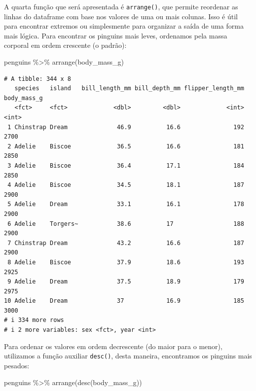 \documentclass[
  12pt,
  letterpaper,
  DIV=11,
  numbers=noendperiod]{scrreprt}
\newenvironment{Shaded}{\begin{snugshade}}{\end{snugshade}}
\newcommand{\FunctionTok}[1]{\textcolor[rgb]{0.28,0.35,0.67}{#1}}
\newcommand{\NormalTok}[1]{\textcolor[rgb]{0.00,0.23,0.31}{#1}}
\newcommand{\SpecialCharTok}[1]{\textcolor[rgb]{0.37,0.37,0.37}{#1}}
\theoremstyle{definition}
\theoremstyle{exemplo}
\begin{document}
A quarta função que será apresentada é \texttt{arrange()}, que permite
reordenar as linhas do dataframe com base nos valores de uma ou mais
colunas. Isso é útil para encontrar extremos ou simplesmente para
organizar a saída de uma forma mais lógica. Para encontrar os pinguins
mais leves, ordenamos pela massa corporal em ordem crescente (o padrão):

\begin{Shaded}
\begin{Highlighting}[]
\NormalTok{penguins }\SpecialCharTok{\%\textgreater{}\%} 
  \FunctionTok{arrange}\NormalTok{(body\_mass\_g)}
\end{Highlighting}
\end{Shaded}

\begin{verbatim}
# A tibble: 344 x 8
   species   island   bill_length_mm bill_depth_mm flipper_length_mm body_mass_g
   <fct>     <fct>             <dbl>         <dbl>             <int>       <int>
 1 Chinstrap Dream              46.9          16.6               192        2700
 2 Adelie    Biscoe             36.5          16.6               181        2850
 3 Adelie    Biscoe             36.4          17.1               184        2850
 4 Adelie    Biscoe             34.5          18.1               187        2900
 5 Adelie    Dream              33.1          16.1               178        2900
 6 Adelie    Torgers~           38.6          17                 188        2900
 7 Chinstrap Dream              43.2          16.6               187        2900
 8 Adelie    Biscoe             37.9          18.6               193        2925
 9 Adelie    Dream              37.5          18.9               179        2975
10 Adelie    Dream              37            16.9               185        3000
# i 334 more rows
# i 2 more variables: sex <fct>, year <int>
\end{verbatim}

\noindent Para ordenar os valores em ordem decrescente (do maior para o
menor), utilizamos a função auxiliar \texttt{desc()}, desta maneira,
encontramos os pinguins mais pesados:

\begin{Shaded}
\begin{Highlighting}[]
\NormalTok{penguins }\SpecialCharTok{\%\textgreater{}\%} 
  \FunctionTok{arrange}\NormalTok{(}\FunctionTok{desc}\NormalTok{(body\_mass\_g))}
\end{Highlighting}
\end{Shaded}
\end{document}

